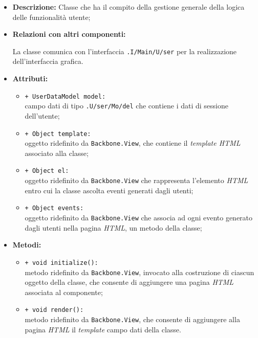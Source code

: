 \begin{flushleft}
\begin{itemize}
\item \textbf{Descrizione:} Classe che ha il compito della gestione generale della logica delle funzionalità utente;
\item \textbf{Relazioni con altri componenti:}
\begin{sloppypar}
La classe comunica con l'interfaccia \texttt{\viewUser{}.I\fshyp{}Main\fshyp{}U\fshyp{}ser} per la realizzazione dell'interfaccia grafica.
\end{sloppypar}
\item \textbf{Attributi:}
\begin{sloppypar}
\begin{itemize}
\item \texttt{+ UserDataModel model:}\\ campo dati di tipo \texttt{\model{}.U\fshyp{}ser\fshyp{}Mo\fshyp{}del} che contiene i dati di sessione dell'utente;
\item \texttt{+ Object template:}\\ oggetto ridefinito da \texttt{Backbone.View}, che contiene il \textit{template HTML} associato alla classe;
\item \texttt{+ Object el:}\\ oggetto ridefinito da \texttt{Backbone.View} che rappresenta l'elemento \textit{HTML} entro cui la classe ascolta eventi generati dagli utenti;
\item \texttt{+ Object events:}\\ oggetto ridefinito da \texttt{Backbone.View} che associa ad ogni evento generato dagli utenti nella pagina \textit{HTML}, un metodo della classe;
\end{itemize}
\end{sloppypar}
\item \textbf{Metodi:}
\begin{sloppypar}
\begin{itemize}
\item \texttt{+ void initialize():}\\ metodo ridefinito da \texttt{Backbone.View}, invocato alla costruzione di ciascun oggetto della classe, che consente di aggiungere una pagina \textit{HTML} associata al componente;
\item \texttt{+ void render():}\\ metodo ridefinito da \texttt{Backbone.View}, che consente di aggiungere alla pagina \textit{HTML} il \textit{template} campo dati della classe.
\end{itemize}
\end{sloppypar}
\end{itemize}
\end{flushleft}

